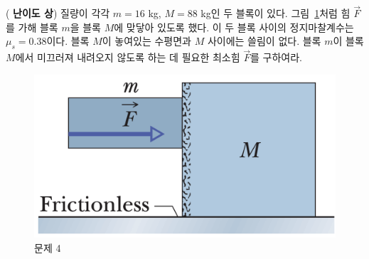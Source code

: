 \documentclass[floatfix,nofootinbib,superscriptaddress,fleqn,preprint]{revtex4}
\begin{document}
 (\textbf{\color{red} 난이도 상})
질량이 각각 $m=16$ kg, $M=88$ kg인 두 블록이 
있다. 그림~\ref{fig:4}처럼 힘 $\vec{F}$를 가해 블록 $m$을 블록 $M$에
맞닿아 있도록 했다. 이 두 블록 사이의 정지마찰계수는
$\mu_s=0.38$이다. 블록 $M$이 놓여있는 수평면과 $M$ 사이에는 쓸림이
없다.  블록 $m$이 블록 $M$에서 미끄러져 내려오지 않도록 하는 데 필요한
최소힘 $\vec{F}$를 구하여라. 
\begin{figure}[ht]
  \centering
\includegraphics[scale=0.3]{Qfig6-4-20220321.png}  
  \caption{문제 4}
  \label{fig:4}
\end{figure}
\end{document}
